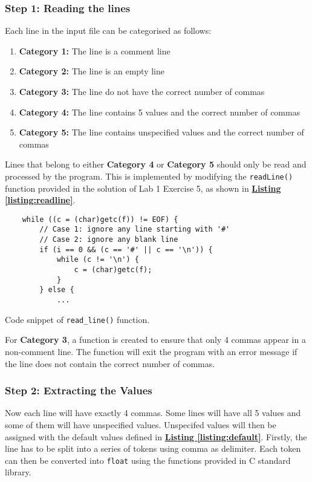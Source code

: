 \documentclass[12pt, a4paper]{article}
\begin{document}
\subsubsection*{Step 1: Reading the lines}
Each line in the input file can be categorised as follows:
\begin{enumerate}
    \item \textbf{Category 1:} The line is a comment line
    \item \textbf{Category 2:} The line is an empty line
    \item \textbf{Category 3:} The line do not have the correct number of commas
    \item \textbf{Category 4:} The line contains 5 values and the correct number of commas
    \item \textbf{Category 5:} The line contains unspecified values and the correct number of commas
\end{enumerate}

Lines that belong to either \textbf{Category 4} or \textbf{Category 5} should only be read and
processed by the program. This is implemented by modifying the \texttt{readLine()} function
provided in the solution of Lab 1 Exercise 5, as shown in
\hyperref[listing:readline]{\textbf{Listing \ref*{listing:readline}}}.

\begin{listing}[ht]
\begin{verbatim}
    while ((c = (char)getc(f)) != EOF) {
        // Case 1: ignore any line starting with '#'
        // Case 2: ignore any blank line
        if (i == 0 && (c == '#' || c == '\n')) {
            while (c != '\n') {
                c = (char)getc(f);
            }
        } else {
            ...
\end{verbatim}
\caption{Code snippet of \texttt{read_line()} function.} \label{listing:readline}
\end{listing}

For \textbf{Category 3}, a function is created to ensure that only 4 commas appear in a non-comment
line. The function will exit the program with an error message if the line does not contain the
correct number of commas.

\subsubsection*{Step 2: Extracting the Values}
Now each line will have exactly 4 commas. Some lines will have all 5 values and some of them will
have unspecified values. Unspecifed values will then be assigned with the default values defined in
\hyperref[listing:default]{\textbf{Listing \ref*{listing:default}}}. Firstly, the line has to be
split into a series of tokens using comma as delimiter. Each token can then be converted into
\texttt{float} using the functions provided in C standard library.
\end{document}

